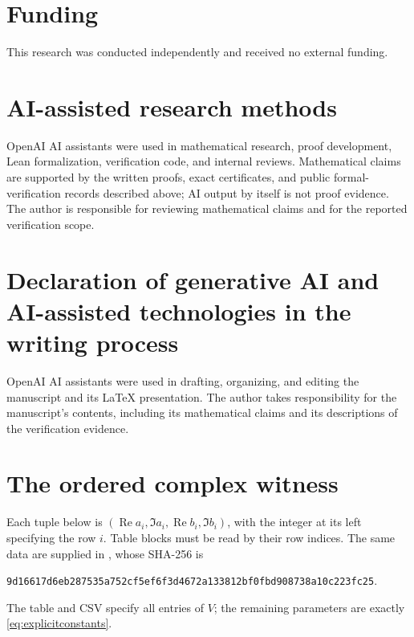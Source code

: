 \documentclass[11pt]{article}
\theoremstyle{remark}
\DeclareMathOperator{\Rea}{Re}
\begin{document}
\begingroup\small
\section*{Funding}
This research was conducted independently and received no external funding.

\section*{AI-assisted research methods}
OpenAI AI assistants were used in mathematical research, proof development,
Lean formalization, verification code, and internal reviews. Mathematical
claims are supported by the written proofs, exact certificates, and public
formal-verification records described above; AI output by itself is not
proof evidence. The author is responsible for reviewing mathematical
claims and for the reported verification scope.

\section*{Declaration of generative AI and AI-assisted technologies
in the writing process}
OpenAI AI assistants were used in drafting, organizing, and editing the
manuscript and its LaTeX presentation. The author takes responsibility
for the manuscript's contents, including its mathematical claims and
its descriptions of the verification evidence.

\endgroup
\appendix
\section{The ordered complex witness}\label{app:data}
Each tuple below is $(\Rea a_i,\Im a_i,\Rea b_i,\Im b_i)$, with
the integer at its left specifying the row $i$. Table blocks must
be read by their row indices. The same data are supplied in
, whose SHA-256 is
\begin{center}\scriptsize\texttt{9d16617d6eb287535a752cf5ef6f3d4672a133812bf0fbd908738a10c223fc25}.\end{center}
The table and CSV specify all entries of $V$; the remaining
parameters are exactly \eqref{eq:explicitconstants}.

\end{document}
